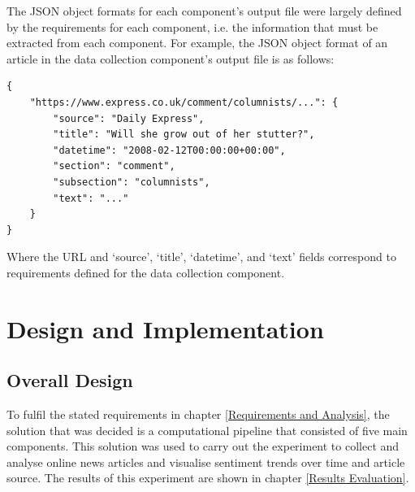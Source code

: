 \documentclass{report}
\begin{document}
The JSON object formats for each component's output file were largely defined by the requirements for each component, i.e. the information that must be extracted from each component.
For example, the JSON object format of an article in the data collection component's output file is as follows:
\begin{lstlisting}
{
	"https://www.express.co.uk/comment/columnists/...": {
		"source": "Daily Express",
		"title": "Will she grow out of her stutter?",
		"datetime": "2008-02-12T00:00:00+00:00",
		"section": "comment",
		"subsection": "columnists",
		"text": "..."
	}
}
\end{lstlisting}
Where the URL and `source', `title', `datetime', and `text' fields correspond to requirements defined for the data collection component.



\chapter{Design and Implementation} \label{Design and Implementation} %

\section{Overall Design} \label{Overall Design}

To fulfil the stated requirements in chapter \ref{Requirements and Analysis}, the solution that was decided is a computational pipeline that consisted of five main components.
This solution was used to carry out the experiment to collect and analyse online news articles and visualise sentiment trends over time and article source.
The results of this experiment are shown in chapter \ref{Results Evaluation}.
\end{document}
